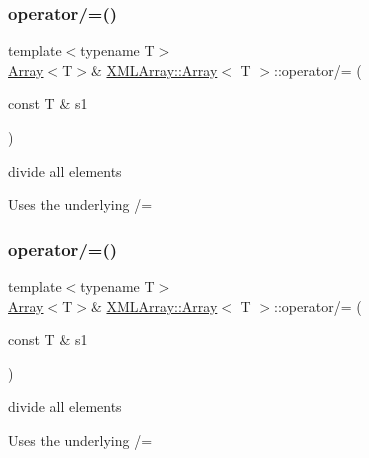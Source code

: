 \subsubsection{\texorpdfstring{operator/=()}{operator/=()}\hspace{0.1cm}{\footnotesize\ttfamily [4/6]}}
{\footnotesize\ttfamily template$<$typename T$>$ \\
\mbox{\hyperlink{classXMLArray_1_1Array}{Array}}$<$T$>$\& \mbox{\hyperlink{classXMLArray_1_1Array}{X\+M\+L\+Array\+::\+Array}}$<$ T $>$\+::operator/= (\begin{DoxyParamCaption}\item[{const T \&}]{s1 }\end{DoxyParamCaption})\hspace{0.3cm}{\ttfamily [inline]}}



divide all elements 

Uses the underlying /= \mbox{\label{classXMLArray_1_1Array_add7ef0354bf795511a654f1241da3318}} 
\subsubsection{\texorpdfstring{operator/=()}{operator/=()}\hspace{0.1cm}{\footnotesize\ttfamily [5/6]}}
{\footnotesize\ttfamily template$<$typename T$>$ \\
\mbox{\hyperlink{classXMLArray_1_1Array}{Array}}$<$T$>$\& \mbox{\hyperlink{classXMLArray_1_1Array}{X\+M\+L\+Array\+::\+Array}}$<$ T $>$\+::operator/= (\begin{DoxyParamCaption}\item[{const T \&}]{s1 }\end{DoxyParamCaption})\hspace{0.3cm}{\ttfamily [inline]}}



divide all elements 

Uses the underlying /= \mbox{\label{classXMLArray_1_1Array_add7ef0354bf795511a654f1241da3318}} 
